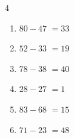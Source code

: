 \begin{multicols}{4}
\begin{enumerate}
  \item $80-47$
        $=33$

  \item $52-33$
        $=19$

  \item $78-38$
        $=40$

  \item $28-27$
        $=1$

  \item $83-68$
        $=15$

  \item $71-23$
        $=48$

\end{enumerate}
\end{multicols}
